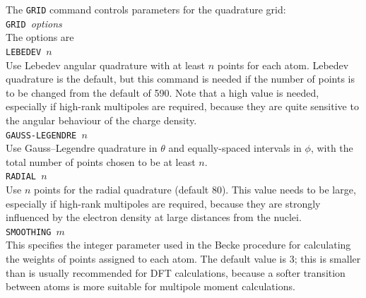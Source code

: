 \documentclass[12pt,txfonts]{paper}
\let\cite=\citep
\begin{document}
The \verb/GRID/ command controls parameters for the quadrature grid:\\
\hspace*{2 em}\verb/GRID /\emph{options}\\
The options are\\
\hspace*{2 em}\verb/LEBEDEV /$n$\\
Use Lebedev angular quadrature\cite{LebedevL99} with at least $n$
points for each atom.
Lebedev quadrature is the default, but this command is needed if the
number of points is to be changed from the default of 590. Note that a
high value is needed, especially if high-rank multipoles are required,
because they are quite sensitive to the angular behaviour of the
charge density.\\
\hspace*{2 em}\verb/GAUSS-LEGENDRE /$n$\\
Use Gauss--Legendre quadrature in $\theta$ and equally-spaced
intervals in $\phi$, with the total number of points chosen to be at
least $n$.\\
\hspace*{2 em}\verb/RADIAL /$n$\\
Use $n$ points for the radial quadrature (default 80). This value
needs to be large, especially if high-rank multipoles are required,
because they are strongly influenced by the electron density at large
distances from the nuclei.\\
\hspace*{2 em}\verb/SMOOTHING /$m$\\
This specifies the integer parameter used in the Becke
procedure\cite{Becke88} for 
calculating the weights of points assigned to each atom. The default
value is 3; this is smaller than is usually recommended for DFT
calculations, because a softer transition between atoms is more
suitable for multipole moment calculations.
\end{document}

